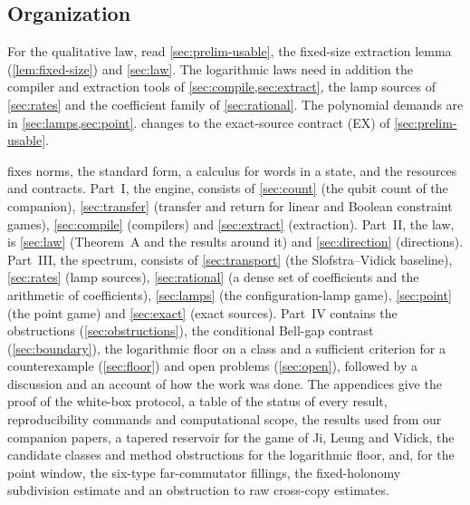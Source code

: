 \subsection{Organization}\label{sec:intro-org}

For the qualitative law, read \cref{sec:prelim-usable}, the fixed-size extraction lemma (\cref{lem:fixed-size}) and
\cref{sec:law}. The logarithmic laws need in addition the compiler and extraction tools of \cref{sec:compile,sec:extract}, the
lamp sources of \cref{sec:rates} and the coefficient family of \cref{sec:rational}. The polynomial demands are in
\cref{sec:lamps,sec:point}.  changes to the exact-source contract (EX) of \cref{sec:prelim-usable}.

 fixes norms, the standard form, a calculus for words in a state, and the resources and contracts. Part~I, the
engine, consists of \cref{sec:count} (the qubit count of the companion), \cref{sec:transfer} (transfer and return
for linear and Boolean constraint games), \cref{sec:compile} (compilers) and \cref{sec:extract} (extraction). Part~II, the law, is
\cref{sec:law} (Theorem~A and the results around it) and \cref{sec:direction} (directions). Part~III, the spectrum, consists of
\cref{sec:transport} (the Slofstra--Vidick baseline), \cref{sec:rates} (lamp sources), \cref{sec:rational} (a dense set of
coefficients and the arithmetic of coefficients),
\cref{sec:lamps} (the configuration-lamp game), \cref{sec:point} (the point game) and \cref{sec:exact} (exact sources). Part~IV contains
the obstructions (\cref{sec:obstructions}), the conditional Bell-gap contrast (\cref{sec:boundary}), the logarithmic floor on a
class and a sufficient criterion for a counterexample (\cref{sec:floor}) and open problems (\cref{sec:open}), followed by a
discussion and an account of how the work was done. The appendices give the proof of the white-box protocol, a table of the status of
every result, reproducibility commands and computational scope, the results used from our companion papers, a tapered reservoir for the game of Ji, Leung and Vidick, the candidate
classes and method obstructions for the logarithmic floor, and, for the point window, the six-type far-commutator fillings, the fixed-holonomy subdivision estimate and an obstruction to raw cross-copy estimates.
